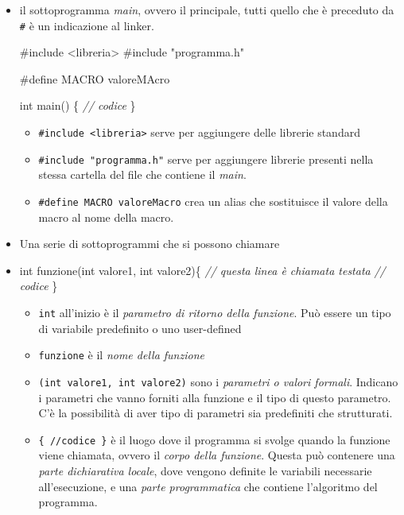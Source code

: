 \documentclass[
]{article}
\newenvironment{Shaded}{}{}
\newcommand{\CommentTok}[1]{\textcolor[rgb]{0.38,0.63,0.69}{\textit{#1}}}
\newcommand{\DataTypeTok}[1]{\textcolor[rgb]{0.56,0.13,0.00}{#1}}
\newcommand{\ImportTok}[1]{#1}
\newcommand{\NormalTok}[1]{#1}
\newcommand{\PreprocessorTok}[1]{\textcolor[rgb]{0.74,0.48,0.00}{#1}}
\begin{document}
\begin{itemize}
\item
  il sottoprogramma \emph{main}, ovvero il principale, tutti quello che
  è preceduto da \texttt{\#} è un indicazione al linker.

\begin{Shaded}
\begin{Highlighting}[]
\PreprocessorTok{\#include }\ImportTok{\textless{}libreria\textgreater{}}
\PreprocessorTok{\#include }\ImportTok{"programma.h"}

\PreprocessorTok{\#define MACRO valoreMAcro}

\DataTypeTok{int}\NormalTok{ main() \{}
	\CommentTok{// codice}
\NormalTok{\}}
\end{Highlighting}
\end{Shaded}

  \begin{itemize}
  \item
    \texttt{\#include\ \textless{}libreria\textgreater{}} serve per
    aggiungere delle librerie standard
  \item
    \texttt{\#include\ "programma.h"} serve per aggiungere librerie
    presenti nella stessa cartella del file che contiene il \emph{main}.
  \item
    \texttt{\#define\ MACRO\ valoreMacro} crea un alias che sostituisce
    il valore della macro al nome della macro.
  \end{itemize}
\item
  Una serie di sottoprogrammi che si possono chiamare
\item
\begin{Shaded}
\begin{Highlighting}[]
\DataTypeTok{int}\NormalTok{ funzione(}\DataTypeTok{int}\NormalTok{ valore1, }\DataTypeTok{int}\NormalTok{ valore2)\{ }\CommentTok{// questa linea è chiamata testata}
	\CommentTok{// codice}
\NormalTok{\}}
\end{Highlighting}
\end{Shaded}

  \begin{itemize}
  \item
    \texttt{int} all'inizio è il \emph{parametro di ritorno della
    funzione}. Può essere un tipo di variabile predefinito o uno
    user-defined
  \item
    \texttt{funzione} è il \emph{nome della funzione}
  \item
    \texttt{(int\ valore1,\ int\ valore2)} sono i \emph{parametri o
    valori formali}. Indicano i parametri che vanno forniti alla
    funzione e il tipo di questo parametro. C'è la possibilità di aver
    tipo di parametri sia predefiniti che strutturati.
  \item
    \texttt{\{\ //codice\ \}} è il luogo dove il programma si svolge
    quando la funzione viene chiamata, ovvero il \emph{corpo della
    funzione}. Questa può contenere una \emph{parte dichiarativa
    locale}, dove vengono definite le variabili necessarie
    all'esecuzione, e una \emph{parte programmatica} che contiene
    l'algoritmo del programma.
  \end{itemize}
\end{itemize}
\end{document}
